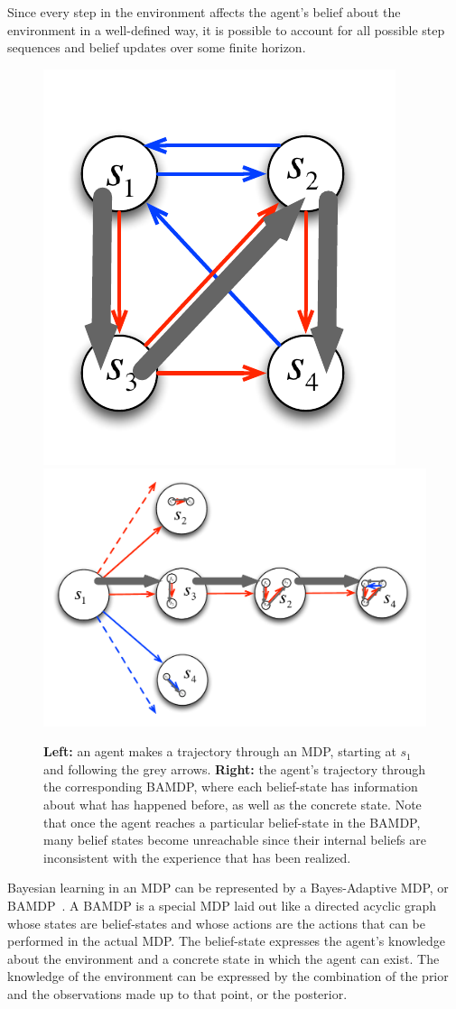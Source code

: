 Since every step in the environment affects the agent's belief about the environment in a well-defined way, it is possible to account for all possible step sequences and belief updates over some finite horizon.

\begin{figure}[t]
\begin{center}
\includegraphics[width=0.25\linewidth]{figures/bamdp-traversal-mdp.pdf}
\includegraphics[width=0.55\linewidth]{figures/bamdp-traversal-bamdp.pdf}
\caption{{\bf Left:} an agent makes a trajectory through an MDP, starting at $s_1$ and following the grey arrows.  {\bf Right:} the agent's trajectory through the corresponding BAMDP, where each belief-state has information about what has happened before, as well as the concrete state. Note that once the agent reaches a particular belief-state in the BAMDP, many belief states become unreachable since their internal beliefs are inconsistent with the experience that has been realized.}
\label{intro:bamdp-traversal}
\end{center}
\end{figure}

Bayesian learning in an MDP can be represented by a Bayes-Adaptive MDP, or BAMDP~\cite{duff03}. A BAMDP is a special MDP laid out like a directed acyclic graph whose states are belief-states and whose actions are the actions that can be performed in the actual MDP. The belief-state expresses the agent's knowledge about the environment and a concrete state in which the agent can exist. The knowledge of the environment can be expressed by the combination of the prior and the observations made up to that point, or the posterior.

